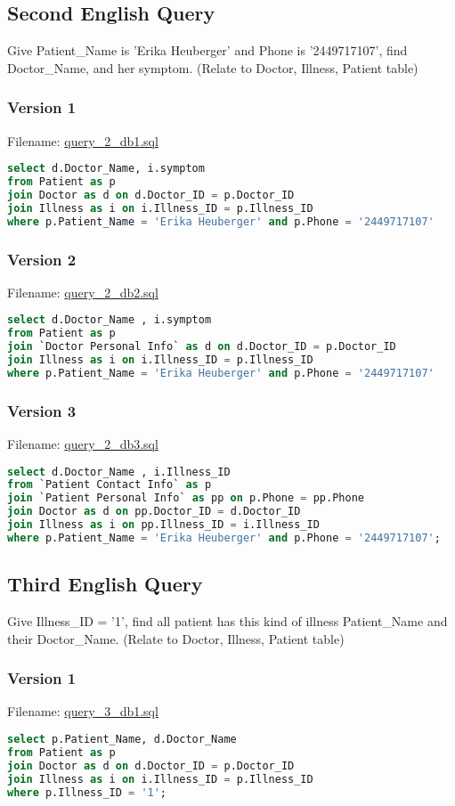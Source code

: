 \documentclass[12pt,arial]{article}
\begin{document}
\subsection{Second English Query}
Give Patient\_Name is 'Erika Heuberger' and Phone is '2449717107', find Doctor\_Name, and her symptom.
(Relate to Doctor, Illness, Patient table)
\subsubsection{Version 1}
Filename: \url{query_2_db1.sql}
\begin{lstlisting}[language=SQL]
select d.Doctor_Name, i.symptom
from Patient as p
join Doctor as d on d.Doctor_ID = p.Doctor_ID
join Illness as i on i.Illness_ID = p.Illness_ID
where p.Patient_Name = 'Erika Heuberger' and p.Phone = '2449717107'
\end{lstlisting}
\subsubsection{Version 2}
Filename: \url{query_2_db2.sql}
\begin{lstlisting}[language=SQL]
select d.Doctor_Name , i.symptom
from Patient as p
join `Doctor Personal Info` as d on d.Doctor_ID = p.Doctor_ID
join Illness as i on i.Illness_ID = p.Illness_ID
where p.Patient_Name = 'Erika Heuberger' and p.Phone = '2449717107'
\end{lstlisting}
\subsubsection{Version 3}
Filename: \url{query_2_db3.sql}
\begin{lstlisting}[language=SQL]
select d.Doctor_Name , i.Illness_ID
from `Patient Contact Info` as p
join `Patient Personal Info` as pp on p.Phone = pp.Phone
join Doctor as d on pp.Doctor_ID = d.Doctor_ID
join Illness as i on pp.Illness_ID = i.Illness_ID
where p.Patient_Name = 'Erika Heuberger' and p.Phone = '2449717107';
\end{lstlisting}

\subsection{Third English Query}
Give Illness\_ID = '1', find all patient has this kind of illness Patient\_Name and their Doctor\_Name.
(Relate to Doctor, Illness, Patient table)
\subsubsection{Version 1}
Filename: \url{query_3_db1.sql}
\begin{lstlisting}[language=SQL]
select p.Patient_Name, d.Doctor_Name
from Patient as p
join Doctor as d on d.Doctor_ID = p.Doctor_ID
join Illness as i on i.Illness_ID = p.Illness_ID
where p.Illness_ID = '1';
\end{lstlisting}
\end{document}
